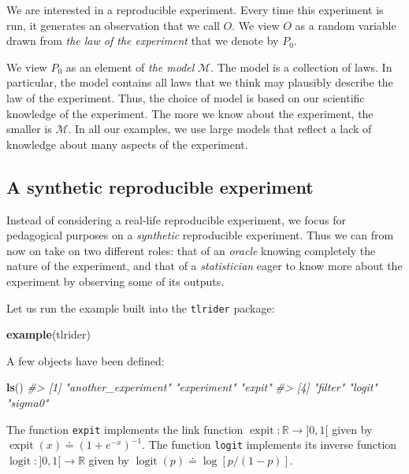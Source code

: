 \documentclass[11pt,openright,twoside]{book}
\newenvironment{Shaded}{\begin{snugshade}}{\end{snugshade}}
\newcommand{\CommentTok}[1]{\textcolor[rgb]{0.56,0.35,0.01}{\textit{#1}}}
\newcommand{\KeywordTok}[1]{\textcolor[rgb]{0.13,0.29,0.53}{\textbf{#1}}}
\newcommand{\NormalTok}[1]{#1}
\DeclareMathOperator{\expit}{expit}
\DeclareMathOperator{\logit}{logit}
\newcommand{\bbR}{\mathbb{R}}
\newcommand{\defq}{\doteq}
\newcommand{\calM}{\mathcal{M}}
\theoremstyle{definition}
\theoremstyle{definition}
\theoremstyle{definition}
\theoremstyle{remark}
\begin{document}
We are interested in a reproducible experiment. Every time this experiment is
run, it generates an observation that we call \(O\). We view \(O\) as a random
variable drawn from \emph{the law of the experiment} that we denote by \(P_{0}\).

We view \(P_{0}\) as an element of \emph{the model} \(\calM\). The model is a
collection of laws. In particular, the model contains all laws that we think
may plausibly describe the law of the experiment. Thus, the choice of model
is based on our scientific knowledge of the experiment. The more we know about
the experiment, the smaller is \(\calM\). In all our examples, we use large
models that reflect a lack of knowledge about many aspects of the experiment.

\hypertarget{synthetic-experiment}{%
\subsection{A synthetic reproducible experiment}\label{synthetic-experiment}}

Instead of considering a real-life reproducible experiment, we focus for
pedagogical purposes on a \emph{synthetic} reproducible experiment. Thus we can
from now on take on two different roles: that of an \emph{oracle} knowing
completely the nature of the experiment, and that of a \emph{statistician} eager to
know more about the experiment by observing some of its outputs.

Let us run the example built into the \texttt{tlrider} package:

\begin{Shaded}
\begin{Highlighting}[]
\KeywordTok{example}\NormalTok{(tlrider)}
\end{Highlighting}
\end{Shaded}

A few objects have been defined:

\begin{Shaded}
\begin{Highlighting}[]
\KeywordTok{ls}\NormalTok{()}
\CommentTok{#> [1] "another_experiment" "experiment"         "expit"             }
\CommentTok{#> [4] "filter"             "logit"              "sigma0"}
\end{Highlighting}
\end{Shaded}

The function \texttt{expit} implements the link function \(\expit : \bbR \to ]0,1[\) given
by \(\expit(x) \defq (1 + e^{-x})^{-1}\). The function \texttt{logit} implements its
inverse function \(\logit : ]0,1[ \to \bbR\) given by \(\logit(p) \defq \log [p/(1-p)]\).
\end{document}
